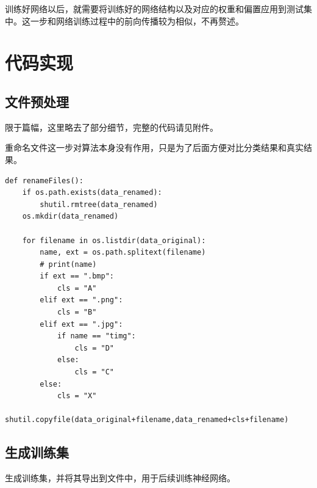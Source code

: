 \documentclass[a4paper, 12pt]{article}
\begin{document}
训练好网络以后，就需要将训练好的网络结构以及对应的权重和偏置应用到测试集中。这一步和网络训练过程中的前向传播较为相似，不再赘述。


\newpage

\section{代码实现}
\subsection{文件预处理}
限于篇幅，这里略去了部分细节，完整的代码请见附件。

重命名文件这一步对算法本身没有作用，只是为了后面方便对比分类结果和真实结果。

\begin{lstlisting}[style=myPython,caption={重命名文件}]
def renameFiles():
    if os.path.exists(data_renamed): 
        shutil.rmtree(data_renamed)
    os.mkdir(data_renamed)

    for filename in os.listdir(data_original):
        name, ext = os.path.splitext(filename)
        # print(name)
        if ext == ".bmp":
            cls = "A"
        elif ext == ".png":
            cls = "B"
        elif ext == ".jpg":
            if name == "timg":
                cls = "D"
            else:
                cls = "C"
        else:
            cls = "X"
        shutil.copyfile(data_original+filename,data_renamed+cls+filename)
\end{lstlisting}

\subsection{生成训练集}
生成训练集，并将其导出到文件中，用于后续训练神经网络。
\end{document}

